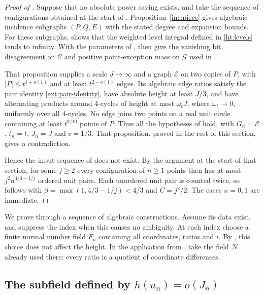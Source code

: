 \begin{proof}[Proof of ]
Suppose that no absolute power saving exists, and take the sequence of
configurations obtained at the start of .
Proposition~\ref{inc:piece} gives algebraic incidence
subgraphs \((P,Q,E)\) with the stated degree and expansion bounds.
For these subgraphs,  shows that the weighted level
integral defined in \eqref{ht:levels} tends to infinity. With the
parameters of , 
then give the vanishing bit disagreement on $\mathcal C$ and positive point-exception mass on $\mathcal G$ used in .

That proposition supplies a scale \(J\to\infty\) and a graph
\(\mathcal E\) on two copies of \(P\), with
\(|P|\le t^{1+o(1)}\) and at least \(t^{2-o(1)}\) edges.
Its algebraic edge ratios satisfy the pair identity
\eqref{ext:pair-identity}, have absolute height at least \(J/3\),
and have alternating products around 4-cycles of height at most \(\omega_tJ\), where
\(\omega_t\to0\), uniformly over all 4-cycles.
No edge joins two points on a real unit circle containing at least
\(t^{9/10}\) points of \(P\). Thus all the hypotheses of
 hold, with \(G_n=\mathcal E\), \(t_n=t\),
\(J_n=J\) and \(c=1/3\). That proposition, proved in the rest of this
section, gives a contradiction.

Hence the input sequence of  does not exist. By the
argument at the start of that section, for some \(j\ge2\) every
configuration of \(n\ge1\) points then has at most \(j^2n^{4/3-1/j}\)
ordered unit pairs. Each unordered unit pair is counted twice, so
 follows with \(\beta=\max(1,4/3-1/j)<4/3\) and
\(C=j^2/2\). The cases \(n=0,1\) are immediate.
\end{proof}

We prove  through a sequence of algebraic constructions.
Assume its data exist, and suppress the index when this causes no
ambiguity. At each index choose a finite normal number field \(F_n\)
containing all coordinates, ratios and \(i\). By , this
choice does not affect the height. In the application from
, take the field \(\mathcal N\) already used there:
every ratio is a quotient of coordinate differences.

\subsection{\texorpdfstring{The subfield defined by $h(u_n)=o(J_n)$}{The subfield defined by h(u n)=o(J n)}}

